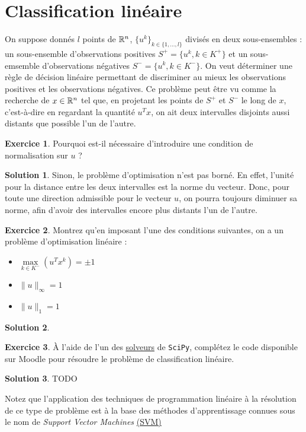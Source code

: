 \documentclass[a4paper,francais]{article}
\newcommand{\R}{{\ensuremath\mathbb{R}}}
\theoremstyle{definition}
\newtheorem{exercice}{Exercice}[section]
\newtheorem*{solution}{Solution}
\begin{document}
\section{Classification linéaire}

On suppose donnés $l$ points de $\R^n$, $\{u^k\}_{k \in \{1,\dots,l\}}$ divisés en deux sous-ensembles :
un sous-ensemble d'observations positives $S^+ = \{ u^k, k \in K^+ \}$ et un sous-emsemble
d'observations négatives $S^- = \{ u^k, k \in K^- \}$. On veut déterminer une règle de décision linéaire
permettant de discriminer au mieux les observations positives et les observations négatives. Ce problème
peut être vu comme la recherche de $x \in \R^n$ tel que, en projetant les points de $S^+$ et $S^-$ le
long de $x$, c'est-à-dire en regardant la quantité $u^T x$, on ait deux intervalles disjoints aussi
distants que possible l'un de l'autre.

\begin{exercice}
  Pourquoi est-il nécessaire d'introduire une condition de normalisation sur $u$ ?
\end{exercice}

\begin{solution}
  Sinon, le problème d'optimisation n'est pas borné. En effet, l'unité pour la distance entre les deux
  intervalles est la norme du vecteur. Donc, pour toute une direction admissible pour le vecteur $u$,
  on pourra toujours diminuer sa norme, afin d'avoir des intervalles encore plus distants l'un de
  l'autre.  
\end{solution}

\begin{exercice}
  Montrez qu'en imposant l'une des conditions suivantes, on a un problème d'optimisation linéaire :
  \begin{itemize}
  \item $\underset{k \in K^-}{\max} (u^T x^k) = \pm 1$
  \item $\|u\|_\infty = 1$
  \item $\|u\|_1 = 1$
  \end{itemize}
\end{exercice}

\begin{solution}
\end{solution}

\begin{exercice}
\`A l'aide de l'un des \href{https://docs.scipy.org/doc/scipy/reference/generated/scipy.optimize.linprog.html}{solveurs}
de \texttt{SciPy}, complétez le code disponible sur Moodle pour résoudre le problème de classification linéaire. 
\end{exercice}

\begin{solution}
TODO
\end{solution}

Notez que l'application des techniques de programmation linéaire à la résolution de ce type de problème
est à la base des méthodes d'apprentissage connues sous le nom de \emph{Support Vector Machines}
\href{https://en.wikipedia.org/wiki/Support-vector_machine}{(SVM)}
\end{document}
